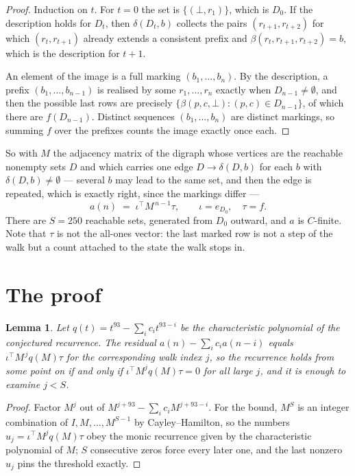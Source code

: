 \documentclass[11pt,a4paper]{article}
\theoremstyle{plain}
\newtheorem{lemma}[theorem]{Lemma}
\theoremstyle{definition}
\begin{document}
\begin{proof}
Induction on $t$. For $t=0$ the set is $\{(\bot,r_1)\}$, which is $D_0$. If the description
holds for $D_t$, then $\delta(D_t,b)$ collects the pairs $(r_{t+1},r_{t+2})$ for which
$(r_t,r_{t+1})$ already extends a consistent prefix and
$\beta(r_t,r_{t+1},r_{t+2})=b$, which is the description for $t+1$.

An element of the image is a full marking $(b_1,\dots,b_n)$. By the description, a prefix
$(b_1,\dots,b_{n-1})$ is realised by some $r_1,\dots,r_n$ exactly when $D_{n-1}\neq
\emptyset$, and then the possible last rows are precisely
$\{\beta(p,c,\bot):(p,c)\in D_{n-1}\}$, of which there are $f(D_{n-1})$. Distinct
sequences $(b_1,\dots,b_n)$ are distinct markings, so summing $f$ over the prefixes counts the
image exactly once each.
\end{proof}

So with $M$ the adjacency matrix of the digraph whose vertices are the reachable nonempty sets
$D$ and which carries one edge $D\to\delta(D,b)$ for each $b$ with $\delta(D,b)\neq\emptyset$
--- several $b$ may lead to the same set, and then the edge is repeated, which is exactly
right, since the markings differ ---
\[
a(n)\;=\;\iota^{\!\top}M^{\,n-1}\tau,\qquad \iota=e_{D_0},\quad \tau=f .
\]
There are $S=250$ reachable sets, generated from $D_0$ outward, and $a$ is $C$-finite. Note
that $\tau$ is not the all-ones vector: the last marked row is not a step of the walk but a
count attached to the state the walk stops in.

\section{The proof}

\begin{lemma}\label{lem:crit}
Let $q(t)=t^{93}-\sum_i c_it^{93-i}$ be the characteristic polynomial of the
conjectured recurrence. The residual $a(n)-\sum_ic_ia(n-i)$ equals
$\iota^{\!\top}M^{\,j}q(M)\tau$ for the corresponding walk index $j$, so the recurrence
holds from some point on if and only if $\iota^{\!\top}M^{j}q(M)\tau=0$ for all large $j$,
and it is enough to examine $j<S$.
\end{lemma}

\begin{proof}
Factor $M^{j}$ out of $M^{j+93}-\sum_ic_iM^{j+93-i}$. For the bound, $M^{S}$
is an integer combination of $I,M,\dots,M^{S-1}$ by Cayley--Hamilton, so the numbers
$u_j=\iota^{\!\top}M^{j}q(M)\tau$ obey the monic recurrence given by the characteristic
polynomial of $M$; $S$ consecutive zeros force every later one, and the last nonzero $u_j$
pins the threshold exactly.
\end{proof}
\end{document}
